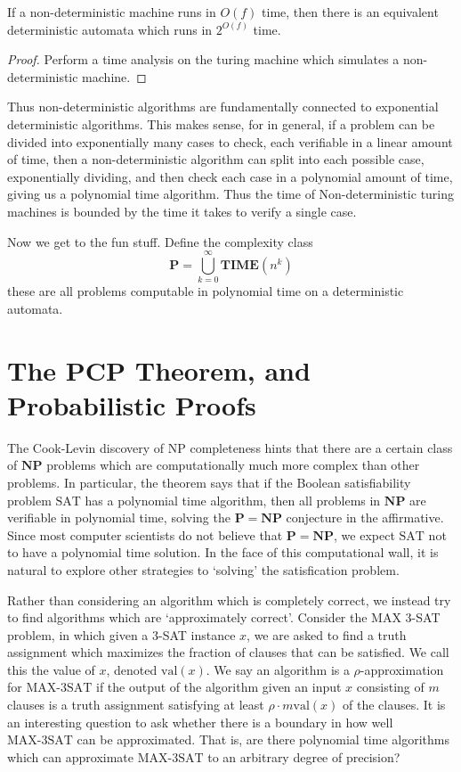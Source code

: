 \begin{theorem}
    If a non-deterministic machine runs in $O(f)$ time, then there is an equivalent deterministic automata which runs in $2^{O(f)}$ time.
\end{theorem}
\begin{proof}
    Perform a time analysis on the turing machine which simulates a non-deterministic machine.
\end{proof}

Thus non-deterministic algorithms are fundamentally connected to exponential deterministic algorithms. This makes sense, for in general, if a problem can be divided into exponentially many cases to check, each verifiable in a linear amount of time, then a non-deterministic algorithm can split into each possible case, exponentially dividing, and then check each case in a polynomial amount of time, giving us a polynomial time algorithm. Thus the time of Non-deterministic turing machines is bounded by the time it takes to verify a single case.

Now we get to the fun stuff. Define the complexity class
%
\[ \textbf{P} = \bigcup_{k = 0}^\infty \textbf{TIME}(n^k) \]
%
these are all problems computable in polynomial time on a deterministic automata.





\chapter{The PCP Theorem, and Probabilistic Proofs}

The Cook-Levin discovery of NP completeness hints that there are a certain class of $\mathbf{NP}$ problems which are computationally much more complex than other problems. In particular, the theorem says that if the Boolean satisfiability problem $\text{SAT}$ has a polynomial time algorithm, then all problems in $\mathbf{NP}$ are verifiable in polynomial time, solving the $\mathbf{P} = \mathbf{NP}$ conjecture in the affirmative. Since most computer scientists do not believe that $\mathbf{P} = \mathbf{NP}$, we expect $\text{SAT}$ not to have a polynomial time solution. In the face of this computational wall, it is natural to explore other strategies to `solving' the satisfication problem.

Rather than considering an algorithm which is completely correct, we instead try to find algorithms which are `approximately correct'. Consider the MAX 3-SAT problem, in which given a 3-SAT instance $x$, we are asked to find a truth assignment which maximizes the fraction of clauses that can be satisfied. We call this the value of $x$, denoted $\text{val}(x)$. We say an algorithm is a $\rho$-approximation for $\text{MAX-3SAT}$ if the output of the algorithm given an input $x$ consisting of $m$ clauses is a truth assignment satisfying at least $\rho \cdot m \text{val}(x)$ of the clauses. It is an interesting question to ask whether there is a boundary in how well $\text{MAX-3SAT}$ can be approximated. That is, are there polynomial time algorithms which can approximate $\text{MAX-3SAT}$ to an arbitrary degree of precision?

